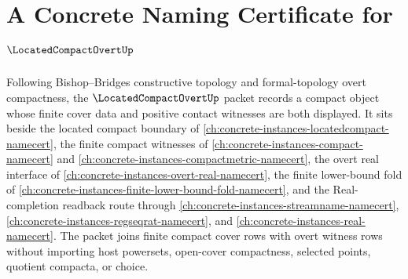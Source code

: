 \chapter{A Concrete Naming Certificate for $\LocatedCompactOvertUp$}
\label{ch:concrete-instances-located-compact-overt-namecert}

Following Bishop--Bridges constructive topology and formal-topology overt compactness, the $\LocatedCompactOvertUp$ packet records a compact object whose finite cover data and positive contact witnesses are both displayed. It sits beside the located compact boundary of \autoref{ch:concrete-instances-locatedcompact-namecert}, the finite compact witnesses of \autoref{ch:concrete-instances-compact-namecert} and \autoref{ch:concrete-instances-compactmetric-namecert}, the overt real interface of \autoref{ch:concrete-instances-overt-real-namecert}, the finite lower-bound fold of \autoref{ch:concrete-instances-finite-lower-bound-fold-namecert}, and the Real-completion readback route through \autoref{ch:concrete-instances-streamname-namecert}, \autoref{ch:concrete-instances-regseqrat-namecert}, and \autoref{ch:concrete-instances-real-namecert}. The packet joins finite compact cover rows with overt witness rows without importing host powersets, open-cover compactness, selected points, quotient compacta, or choice.

